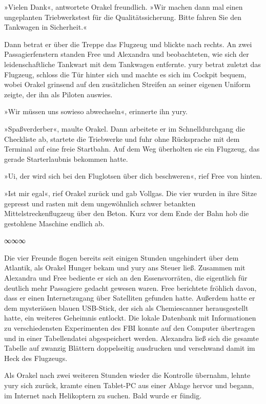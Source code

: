 »Vielen Dank«, antwortete Orakel freundlich. »Wir machen dann mal einen ungeplanten Triebwerkstest für die Qualitätssicherung. Bitte fahren Sie den Tankwagen in Sicherheit.«

Dann betrat er über die Treppe das Flugzeug und blickte nach rechts. An zwei Passagierfenstern standen Free und Alexandra und beobachteten, wie sich der leidenschaftliche Tankwart mit dem Tankwagen entfernte. yury betrat zuletzt das Flugzeug, schloss die Tür hinter sich und machte es sich im Cockpit bequem, wobei Orakel grinsend auf den zusätzlichen Streifen an seiner eigenen Uniform zeigte, der ihn als Piloten auswies.

»Wir müssen uns sowieso abwechseln«, erinnerte ihn yury.

»Spaßverderber«, maulte Orakel. Dann arbeitete er im Schnelldurchgang die Checkliste ab, startete die Triebwerke und fuhr ohne Rücksprache mit dem Terminal auf eine freie Startbahn. Auf dem Weg überholten sie ein Flugzeug, das gerade Starterlaubnis bekommen hatte.

»Ui, der wird sich bei den Fluglotsen über dich beschweren«, rief Free von hinten.

»Ist mir egal«, rief Orakel zurück und gab Vollgas. Die vier wurden in ihre Sitze gepresst und rasten mit dem ungewöhnlich schwer betankten Mittelstreckenflugzeug über den Beton. Kurz vor dem Ende der Bahn hob die gestohlene Maschine endlich ab.

\begin{center}
    ∞∞∞
\end{center}

Die vier Freunde flogen bereits seit einigen Stunden ungehindert über dem Atlantik, als Orakel Hunger bekam und yury ans Steuer ließ. Zusammen mit Alexandra und Free bediente er sich an den Essensvorräten, die eigentlich für deutlich mehr Passagiere gedacht gewesen waren. Free berichtete fröhlich davon, dass er einen Internetzugang über Satelliten gefunden hatte. Außerdem hatte er dem mysteriösen blauen USB-Stick, der sich als Chemiescanner herausgestellt hatte, ein weiteres Geheimnis entlockt. Die lokale Datenbank mit Informationen zu verschiedensten Experimenten des FBI konnte auf den Computer übertragen und in einer Tabellendatei abgespeichert werden. Alexandra ließ sich die gesamte Tabelle auf zwanzig Blättern doppelseitig ausdrucken und verschwand damit im Heck des Flugzeugs.

Als Orakel nach zwei weiteren Stunden wieder die Kontrolle übernahm, lehnte yury sich zurück, kramte einen Tablet-PC aus einer Ablage hervor und begann, im Internet nach Helikoptern zu suchen. Bald wurde er fündig.

